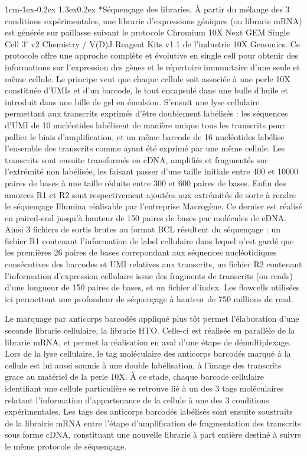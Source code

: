 \documentclass[12pt]{report}
\makeatletter
\renewcommand\subparagraph{\@startsection{subparagraph}{5}{\z@}%
	{1cm\@plus -1ex\@minus -0.2ex}%
	{1.3ex\@plus 0.2ex}%
	{\reset@font\normalsize\it}}
\makeatother
\begin{document}
\subparagraph*{Séquençage des libraries.}
À partir du mélange des 3 conditions expérimentales, une librarie d'expressions géniques (ou librarie mRNA) est générée sur paillasse suivant le protocole Chromium 10X Next GEM Single Cell 3' v2 Chemistry / V(D)J Reagent Kits v1.1 de l'industrie 10X Genomics.
Ce protocole offre une approche complète et évolutive en single cell pour obtenir des informations sur l'expression des gènes et le répertoire immunitaire d'une seule et même cellule.
Le principe veut que chaque cellule soit associée à une perle 10X constituée d'UMIs et d'un barcode, le tout encapsulé dans une bulle d'huile et introduit dans une bille de gel en émulsion.
S'ensuit une lyse cellulaire permettant aux transcrits exprimés d'être doublement labélisés : les séquences d'UMI de 10 nucléotides labélisent de manière unique tous les transcrits pour pallier le biais d'amplification, 
et un même barcode de 16 nucléotides labélise l'ensemble des transcrits comme ayant été exprimé par une même cellule.
Les transcrits sont ensuite transformés en cDNA, amplifiés et fragmentés sur l'extrémité non labélisée, les faisant passer d'une taille initiale entre 400 et 10000 paires de bases à une taille réduite entre 300 et 600 paires de bases.
Enfin des amorces R1 et R2 sont respectivement ajoutées aux extrémités de sorte à rendre le séquençage Illumina réalisable par l'entreprise Macrogène. 
Ce dernier est réalisé en paired-end jusqu'à hauteur de 150 paires de bases par molécules de cDNA. Ainsi 3 fichiers de sortis brutes au format BCL résultent du séquençage : 
un fichier R1 contenant l'information de label cellulaire dans lequel n'est gardé que les premières 26 paires de bases correpondant aux séquences nucléotidiques consécutives des barcodes et UMI relatives aux transcrits, 
un fichier R2 contenant l'information d'expression cellulaire issue des fragments de transcrits (ou reads) d'une longueur de 150 paires de bases, et un fichier d'index. 
Les flowcells utilisées ici permettent une profondeur de séquençage à hauteur de 750 millions de read.

Le marquage par anticorps barcodés appliqué plus tôt permet l'élaboration d'une seconde librarie cellulaire, la librarie HTO. Celle-ci est réalisée en parallèle de la librarie mRNA, et permet la réalisation en aval d'une étape de démultiplexage.
Lors de la lyse cellulaire, le tag moléculaire des anticorps barcodés marqué à la cellule est lui aussi soumis à une double labélisation, à l'image des transcrits grace au matériel de la perle 10X.  
À ce stade, chaque barcode cellulaire identifiant une cellule particulière se retrouve lié à un des 3 tags moléculaires relatant l'information d'appartenance de la cellule à une des 3 conditions expérimentales.
Les tags des anticorps barcodés labélisés sont ensuite soustraits de la librairie mRNA entre l'étape d'amplification de fragmentation des transcrits sous forme cDNA, constituant une nouvelle librarie à part entière destiné à suivre le même protocole de séquençage.
\end{document}
